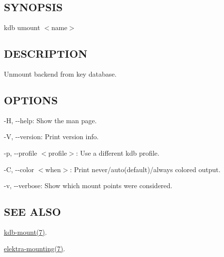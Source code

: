 \subsection*{S\+Y\+N\+O\+P\+S\+IS}

{\ttfamily kdb umount $<$name$>$}

\subsection*{D\+E\+S\+C\+R\+I\+P\+T\+I\+ON}

Unmount backend from key database.

\subsection*{O\+P\+T\+I\+O\+NS}


\begin{DoxyItemize}
\item {\ttfamily -\/H}, {\ttfamily -\/-\/help}\+: Show the man page.
\item {\ttfamily -\/V}, {\ttfamily -\/-\/version}\+: Print version info.
\item {\ttfamily -\/p}, {\ttfamily -\/-\/profile $<$profile$>$}\+: Use a different kdb profile.
\item {\ttfamily -\/C}, {\ttfamily -\/-\/color $<$when$>$}\+: Print never/auto(default)/always colored output.
\item {\ttfamily -\/v}, {\ttfamily -\/-\/verbose}\+: Show which mount points were considered.
\end{DoxyItemize}

\subsection*{S\+EE A\+L\+SO}


\begin{DoxyItemize}
\item \hyperlink{doc_help_kdb-mount_md}{kdb-\/mount(7)}.
\item \hyperlink{doc_help_elektra-mounting_md}{elektra-\/mounting(7)}. 
\end{DoxyItemize}